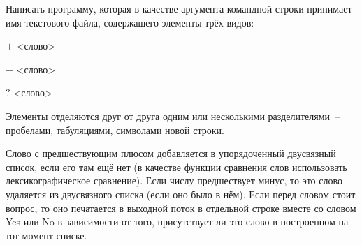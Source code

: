 

Написать программу, которая в качестве аргумента командной строки
принимает имя текстового файла, содержащего элементы трёх видов:
\begin{description}
\item{$+$} <слово>
\item{$-$} <слово>
\item{$?$} <слово>
\end{description}

Элементы отделяются друг от друга одним или несколькими
разделителями~-- пробелами, табуляциями, символами новой строки.

Слово
с предшествующим плюсом добавляется в упорядоченный двусвязный
список, если его там ещё нет (в качестве функции сравнения слов
использовать лексикографическое сравнение). Если числу предшествует
минус, то это слово удаляется из двусвязного списка (если оно было в нём).
Если перед словом стоит вопрос, то оно печатается в выходной поток в
отдельной строке вместе со словом Yes или No в зависимости от того,
присутствует ли это слово в построенном на тот момент списке.
